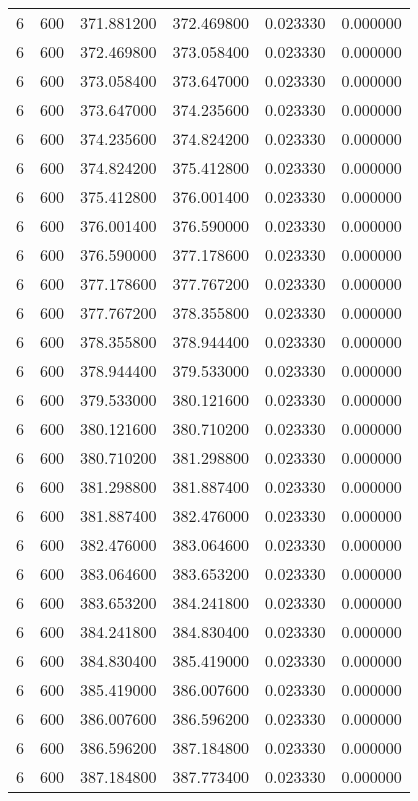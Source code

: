 \begin{longtable}{rrrrrr}
6 & 600 & 371.881200 & 372.469800 & 0.023330 & 0.000000 \\
6 & 600 & 372.469800 & 373.058400 & 0.023330 & 0.000000 \\
6 & 600 & 373.058400 & 373.647000 & 0.023330 & 0.000000 \\
6 & 600 & 373.647000 & 374.235600 & 0.023330 & 0.000000 \\
6 & 600 & 374.235600 & 374.824200 & 0.023330 & 0.000000 \\
6 & 600 & 374.824200 & 375.412800 & 0.023330 & 0.000000 \\
6 & 600 & 375.412800 & 376.001400 & 0.023330 & 0.000000 \\
6 & 600 & 376.001400 & 376.590000 & 0.023330 & 0.000000 \\
6 & 600 & 376.590000 & 377.178600 & 0.023330 & 0.000000 \\
6 & 600 & 377.178600 & 377.767200 & 0.023330 & 0.000000 \\
6 & 600 & 377.767200 & 378.355800 & 0.023330 & 0.000000 \\
6 & 600 & 378.355800 & 378.944400 & 0.023330 & 0.000000 \\
6 & 600 & 378.944400 & 379.533000 & 0.023330 & 0.000000 \\
6 & 600 & 379.533000 & 380.121600 & 0.023330 & 0.000000 \\
6 & 600 & 380.121600 & 380.710200 & 0.023330 & 0.000000 \\
6 & 600 & 380.710200 & 381.298800 & 0.023330 & 0.000000 \\
6 & 600 & 381.298800 & 381.887400 & 0.023330 & 0.000000 \\
6 & 600 & 381.887400 & 382.476000 & 0.023330 & 0.000000 \\
6 & 600 & 382.476000 & 383.064600 & 0.023330 & 0.000000 \\
6 & 600 & 383.064600 & 383.653200 & 0.023330 & 0.000000 \\
6 & 600 & 383.653200 & 384.241800 & 0.023330 & 0.000000 \\
6 & 600 & 384.241800 & 384.830400 & 0.023330 & 0.000000 \\
6 & 600 & 384.830400 & 385.419000 & 0.023330 & 0.000000 \\
6 & 600 & 385.419000 & 386.007600 & 0.023330 & 0.000000 \\
6 & 600 & 386.007600 & 386.596200 & 0.023330 & 0.000000 \\
6 & 600 & 386.596200 & 387.184800 & 0.023330 & 0.000000 \\
6 & 600 & 387.184800 & 387.773400 & 0.023330 & 0.000000 \\

\end{longtable}
